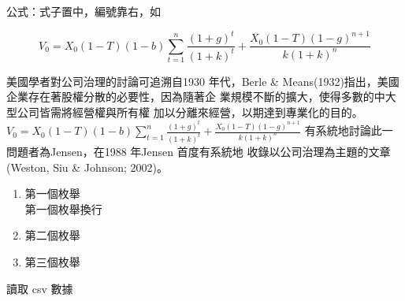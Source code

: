 \documentclass[
    添加扉頁=是,
    添加原創聲明頁=不,
    添加校徽水印=不,
    奇偶頁邊距對稱=不,
    參考文獻頂格=是,
]{.def/must}
\begin{document}
\noindent 公式：式子置中，編號靠右，如


\begin{equation}
V_0=X_0(1-T)(1-b) \sum_{t=1}^n \frac{(1+g)^t}{(1+k)^t}+\frac{X_0(1-T)(1-g)^{n+1}}{k(1+k)^n}
\end{equation}


\par 美國學者對公司治理的討論可追溯自1930 年代，Berle \&
Means(1932)指出，美國企業存在著股權分散的必要性，因為隨著企
業規模不斷的擴大，使得多數的中大型公司皆需將經營權與所有權
加以分離來經營，以期達到專業化的目的。
$V_0=X_0(1-T)(1-b) \sum_{t=1}^n \frac{(1+g)^t}{(1+k)^t}+\frac{X_0(1-T)(1-g)^{n+1}}{k(1+k)^n}$ 
有系統地討論此一問題者為Jensen，在1988 年Jensen 首度有系統地
收錄以公司治理為主題的文章(Weston, Siu \& Johnson; 2002)。
\begin{enumerate}
\item 第一個枚舉\\ 第一個枚舉換行
\item 第二個枚舉 
\item 第三個枚舉 
\end{enumerate}

\begin{table}[htbp]
    \centering
    \caption{讀取 csv 數據}
    \label{tab:mytable}
\end{table}
\end{document}
